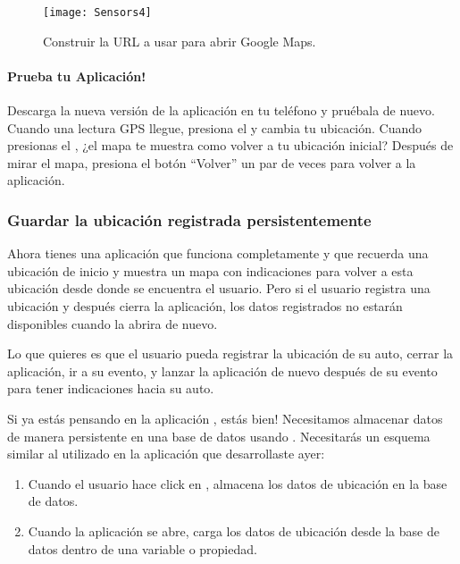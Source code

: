 \begin{figure}[H]
\centering
\texttt{[image: Sensors4]}
\caption{Construir la URL a usar para abrir Google Maps.}
\label{fig:Sensors4}
\end{figure}

\paragraph{Prueba tu Aplicación!} Descarga la nueva versión de la
aplicación en tu teléfono y pruébala de nuevo. Cuando una lectura GPS
llegue, presiona el  y cambia tu
ubicación. Cuando presionas el ,
¿el mapa te muestra como volver a tu ubicación inicial? Después de
mirar el mapa, presiona el botón ``Volver'' un par de veces para
volver a la aplicación.

\subsubsection*{Guardar la ubicación registrada persistentemente}

Ahora tienes una aplicación que funciona completamente y que recuerda
una ubicación de inicio y muestra un mapa con indicaciones para volver
a esta ubicación desde donde se encuentra el usuario. Pero si el
usuario registra una ubicación y después cierra la aplicación, los
datos registrados no estarán disponibles cuando la abrira de nuevo.

Lo que quieres es que el usuario pueda registrar la ubicación de su
auto, cerrar la aplicación, ir a su evento, y lanzar la aplicación de
nuevo después de su evento para tener indicaciones hacia su auto.

Si ya estás pensando en la aplicación , estás bien!
Necesitamos almacenar datos de manera persistente en una base de datos
usando . Necesitarás un esquema similar al utilizado en la
aplicación que desarrollaste ayer:

\begin{enumerate}

\item Cuando el usuario hace click en ,
  almacena los datos de ubicación en la base de datos.

\item Cuando la aplicación se abre, carga los datos de ubicación desde
  la base de datos dentro de una variable o propiedad.
\end{enumerate}

